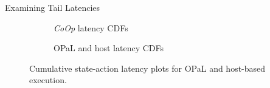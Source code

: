 \documentclass[aspectratio=169,xcolor={dvipsnames}
]{beamer}
\newcommand{\approachshort}{OPaL}
\newcommand{\Coopfw}{\emph{CoOp}}
\begin{document}
\begin{frame}{Examining Tail Latencies}
	\begin{figure}
		\centering
		\begin{subfigure}{0.45\linewidth}
			\caption{\Coopfw{} latency CDFs}
		\end{subfigure}
		\begin{subfigure}{0.45\linewidth}
			\caption{\approachshort{} and host latency CDFs}
		\end{subfigure}
		\caption{Cumulative state-action latency plots for \approachshort{} and host-based execution.\label{fig:lat-cumul}}
	\end{figure}
\end{frame}
\end{document}
